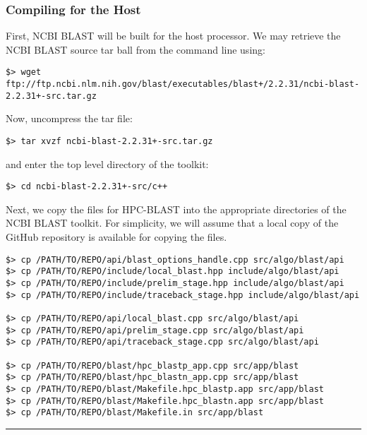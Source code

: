 \documentclass[10pt]{article}
\begin{document}
\subsubsection{Compiling for the Host} \label{sssec:ncbi-host}
First, NCBI BLAST will be built for the host processor.  We may retrieve the NCBI BLAST source tar ball from the command line using:
\begin{verbatim}
$> wget ftp://ftp.ncbi.nlm.nih.gov/blast/executables/blast+/2.2.31/ncbi-blast-2.2.31+-src.tar.gz
\end{verbatim}
Now, uncompress the tar file:
\begin{verbatim}
$> tar xvzf ncbi-blast-2.2.31+-src.tar.gz
\end{verbatim}
\noindent and enter the top level directory of the toolkit:
\begin{verbatim}
$> cd ncbi-blast-2.2.31+-src/c++
\end{verbatim}
\noindent Next, we copy the files for HPC-BLAST into the appropriate directories of the NCBI BLAST toolkit.  
For simplicity, we will assume that a local copy of the
GitHub repository is available for copying the files.  
\footnotesize
\begin{verbatim}
$> cp /PATH/TO/REPO/api/blast_options_handle.cpp src/algo/blast/api
$> cp /PATH/TO/REPO/include/local_blast.hpp include/algo/blast/api
$> cp /PATH/TO/REPO/include/prelim_stage.hpp include/algo/blast/api
$> cp /PATH/TO/REPO/include/traceback_stage.hpp include/algo/blast/api

$> cp /PATH/TO/REPO/api/local_blast.cpp src/algo/blast/api
$> cp /PATH/TO/REPO/api/prelim_stage.cpp src/algo/blast/api
$> cp /PATH/TO/REPO/api/traceback_stage.cpp src/algo/blast/api

$> cp /PATH/TO/REPO/blast/hpc_blastp_app.cpp src/app/blast
$> cp /PATH/TO/REPO/blast/hpc_blastn_app.cpp src/app/blast
$> cp /PATH/TO/REPO/blast/Makefile.hpc_blastp.app src/app/blast
$> cp /PATH/TO/REPO/blast/Makefile.hpc_blastn.app src/app/blast
$> cp /PATH/TO/REPO/blast/Makefile.in src/app/blast
\end{verbatim}
\normalsize

\noindent \rule{16cm}{0.4pt}
\end{document}

